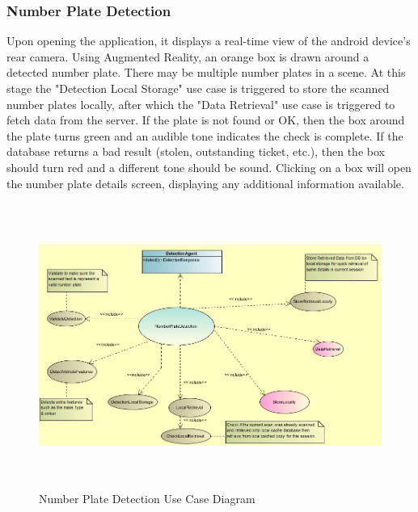 \documentclass[12pt]{article}
\begin{document}
                    		\subsubsection{Number Plate Detection}
                    				Upon opening the application, it displays a real-time view of the android device's rear camera. Using Augmented Reality, an orange box is drawn around a detected number plate. There may be multiple number plates in a scene. At this stage the "Detection Local Storage" use case is triggered to store the scanned number plates locally, after which the "Data Retrieval" use case is triggered to fetch data from the server. If the plate is not found or OK, then the box around the plate turns green and an audible tone indicates the check is complete. If the database returns a bad result (stolen, outstanding ticket, etc.), then the box should turn red and a different tone should be sound.
                    				Clicking on a box will open the number plate details screen, displaying any additional information available.
                    				\begin{figure}[h]
					           				\centering
					           				\includegraphics[width=6.25in, height=3.67in]{Pictures/NumberPlateDetectionUseCase.jpg}
					           				\caption{Number Plate Detection Use Case Diagram}
		           					\end{figure}
                    				\FloatBarrier
                    				
\end{document}
